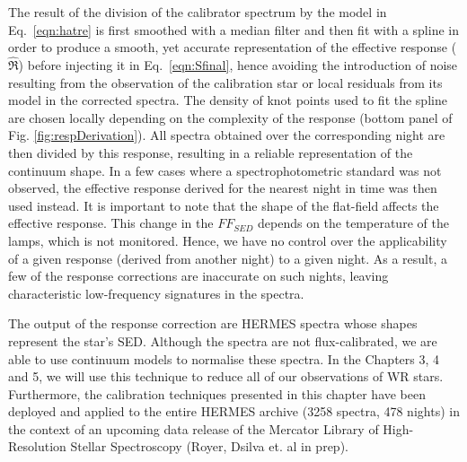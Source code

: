 The result of the division of the calibrator spectrum by the model in Eq.~\ref{eqn:hatre} is first smoothed with a median filter and then fit with a spline in order to produce a smooth, yet accurate representation of the effective response ($\hat{\Re}$) before injecting it in Eq.~\ref{eqn:Sfinal}, hence avoiding the introduction of noise resulting from the observation of the calibration star or local residuals from its model in the corrected spectra. The density of knot points used to fit the spline are chosen locally depending on the complexity of the response (bottom panel of Fig. \ref{fig:respDerivation}). All spectra obtained over the corresponding night are then divided by this response, resulting in a reliable representation of the continuum shape.
In a few cases where a spectrophotometric standard was not observed, the effective response derived for the nearest night in time was then used instead. It is important to note that the shape of the flat-field affects the effective response. This change in the $FF_{SED}$ depends on the temperature of the lamps, which is not monitored. Hence, we have no control over the applicability of a given response (derived from another night) to a given night. As a result, a few of the response corrections are inaccurate on such nights, leaving characteristic low-frequency signatures in the spectra.

The output of the response correction are HERMES spectra whose shapes represent the star's SED. Although the spectra are not flux-calibrated, we are able to use continuum models to normalise these spectra. In the Chapters 3, 4 and 5, we will use this technique to reduce all of our observations of WR stars. Furthermore, the calibration techniques presented in this chapter have been deployed and applied to the entire HERMES archive (3258 spectra, 478 nights) in the context of an upcoming data release of the Mercator Library of High-Resolution Stellar Spectroscopy (Royer, Dsilva et. al in prep).





